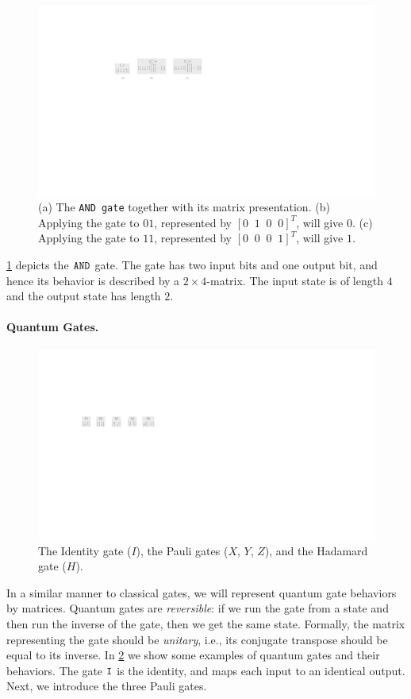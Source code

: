 \begin{figure} 
\includegraphics[scale=0.7]{Figures/Gates/and} 
\caption{(a) The {\tt AND gate} together with its matrix presentation.
  (b) Applying the gate to $01$, represented by $[0\;\;1\;\;0\;\;0]^T$, will give $0$. 
(c) Applying the gate to $11$, represented by $[0\;\;0\;\;0\;\;1]^T$, will give $1$.
}
\label{and:gate:fig}
\end{figure}
%
\cref{and:gate:fig} depicts the $\mathtt{AND}$ gate.
%
The gate has two input bits and one output bit, and hence its behavior is described by a $2\times4$-matrix.
%
The input state is of length $4$ and the output state has length $2$.

\paragraph{Quantum Gates.}
\begin{figure} 
\includegraphics[scale=0.7]{Figures/Gates/qgates} 
\caption{The Identity gate ($I$), the Pauli gates ($X$, $Y$, $Z$), and the Hadamard gate ($H$).
  }
\label{qgates:fig} 
\end{figure}
In a similar manner to classical gates, we will represent quantum gate behaviors by matrices.
%
Quantum gates are {\it reversible}: if we run the gate from a state and then run the inverse of the gate, then we get the  same state.
%
Formally, the matrix representing the gate should be {\it unitary}, i.e., its conjugate transpose should be equal to its inverse.
%
In \cref{qgates:fig} we show some examples of quantum gates and their behaviors.
%
The gate $\mathtt{I}$ is the identity, and maps each input to an identical output.
%
Next, we introduce the three Pauli gates.

